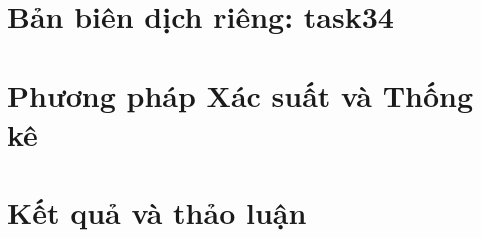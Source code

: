 \documentclass[13pt,a4paper,oneside]{extreport}
\begin{document}
\chapter*{Bản biên dịch riêng: task34}
\chapter{Phương pháp Xác suất và Thống kê}

\chapter{Kết quả và thảo luận}

\printbibliography
\end{document}
